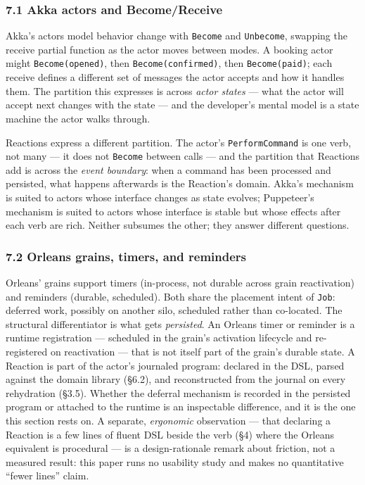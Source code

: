 \documentclass[
]{article}
\let\origtexttt\texttt%
\renewcommand{\texttt}[1]{\origtexttt{\seqsplit{#1}}}%
\let\texttt\origtexttt%
\begin{document}
\subsubsection{7.1 Akka actors and
Become/Receive}\label{akka-actors-and-becomereceive}

Akka's actors model behavior change with \texttt{Become} and
\texttt{Unbecome}, swapping the receive partial function as the actor
moves between modes. A booking actor might \texttt{Become(opened)}, then
\texttt{Become(confirmed)}, then \texttt{Become(paid)}; each receive
defines a different set of messages the actor accepts and how it handles
them. The partition this expresses is across \emph{actor states} ---
what the actor will accept next changes with the state --- and the
developer's mental model is a state machine the actor walks through.

Reactions express a different partition. The actor's
\texttt{PerformCommand} is one verb, not many --- it does not
\texttt{Become} between calls --- and the partition that Reactions add
is across the \emph{event boundary}: when a command has been processed
and persisted, what happens afterwards is the Reaction's domain. Akka's
mechanism is suited to actors whose interface changes as state evolves;
Puppeteer's mechanism is suited to actors whose interface is stable but
whose effects after each verb are rich. Neither subsumes the other; they
answer different questions.

\subsubsection{7.2 Orleans grains, timers, and
reminders}\label{orleans-grains-timers-and-reminders}

Orleans' grains support timers (in-process, not durable across grain
reactivation) and reminders (durable, scheduled). Both share the
placement intent of \texttt{Job}: deferred work, possibly on another
silo, scheduled rather than co-located. The structural differentiator is
what gets \emph{persisted}. An Orleans timer or reminder is a runtime
registration --- scheduled in the grain's activation lifecycle and
re-registered on reactivation --- that is not itself part of the grain's
durable state. A Reaction is part of the actor's journaled program:
declared in the DSL, parsed against the domain library (§6.2), and
reconstructed from the journal on every rehydration (§3.5). Whether the
deferral mechanism is recorded in the persisted program or attached to
the runtime is an inspectable difference, and it is the one this section
rests on. A separate, \emph{ergonomic} observation --- that declaring a
Reaction is a few lines of fluent DSL beside the verb (§4) where the
Orleans equivalent is procedural --- is a design-rationale remark about
friction, not a measured result: this paper runs no usability study and
makes no quantitative ``fewer lines'' claim.
\end{document}
